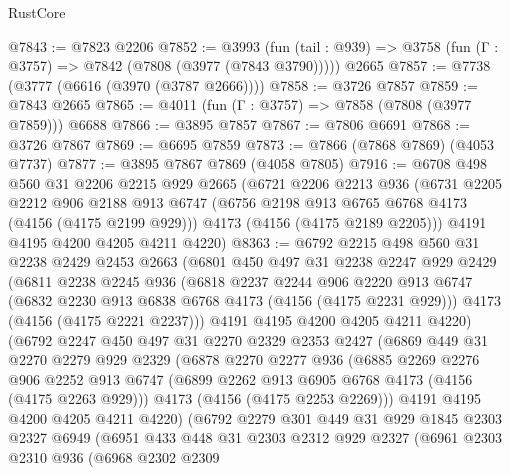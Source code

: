 \begin{lexlean}{RustCore}
\begin{coremodule}
@7843 := @7823 @2206
@7852 := @3993
    (fun (tail : @939) => @3758 (fun (Γ : @3757) => @7842 (@7808 (@3977 (@7843 @3790)))))
    @2665
@7857 := @7738 (@3777 (@6616 (@3970 (@3787 @2666))))
@7858 := @3726 @7857
@7859 := @7843 @2665
@7865 := @4011 (fun (Γ : @3757) => @7858 (@7808 (@3977 @7859))) @6688
@7866 := @3895 @7857
@7867 := @7806 @6691
@7868 := @3726 @7867
@7869 := @6695 @7859
@7873 := @7866 (@7868 @7869) (@4053 @7737)
@7877 := @3895 @7867 @7869 (@4058 @7805)
@7916 := @6708
    @498
    @560
    @31
    @2206
    @2215
    @929
    @2665
    (@6721
      @2206
      @2213
      @936
      (@6731
        @2205
        @2212
        @906
        @2188
        @913
        @6747
        (@6756 @2198 @913 @6765 @6768 @4173 (@4156 (@4175 @2199 @929)))
        @4173
        (@4156 (@4175 @2189 @2205)))
      @4191
      @4195
      @4200
      @4205
      @4211
      @4220)
@8363 := @6792
    @2215
    @498
    @560
    @31
    @2238
    @2429
    @2453
    @2663
    (@6801
      @450
      @497
      @31
      @2238
      @2247
      @929
      @2429
      (@6811
        @2238
        @2245
        @936
        (@6818
          @2237
          @2244
          @906
          @2220
          @913
          @6747
          (@6832 @2230 @913 @6838 @6768 @4173 (@4156 (@4175 @2231 @929)))
          @4173
          (@4156 (@4175 @2221 @2237)))
        @4191
        @4195
        @4200
        @4205
        @4211
        @4220)
      (@6792
        @2247
        @450
        @497
        @31
        @2270
        @2329
        @2353
        @2427
        (@6869
          @449
          @31
          @2270
          @2279
          @929
          @2329
          (@6878
            @2270
            @2277
            @936
            (@6885
              @2269
              @2276
              @906
              @2252
              @913
              @6747
              (@6899 @2262 @913 @6905 @6768 @4173 (@4156 (@4175 @2263 @929)))
              @4173
              (@4156 (@4175 @2253 @2269)))
            @4191
            @4195
            @4200
            @4205
            @4211
            @4220)
          (@6792
            @2279
            @301
            @449
            @31
            @929
            @1845
            @2303
            @2327
            @6949
            (@6951
              @433
              @448
              @31
              @2303
              @2312
              @929
              @2327
              (@6961
                @2303
                @2310
                @936
                (@6968
                  @2302
                  @2309

\end{coremodule}
\end{lexlean}
